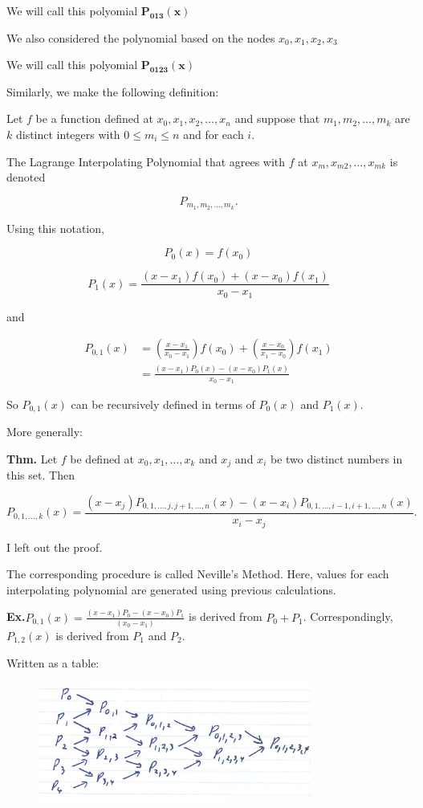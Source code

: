 \documentclass[12pt]{article}
\newcommand{\thm}{\textbf{Thm.}\xspace}
\newcommand{\Ex}{\textbf{Ex.}\xspace}
\begin{document}
We will call this polyomial $\mathbf{P_{013}(x)}$

\noindent
We also considered the polynomial based on the nodes $x_0, x_1, x_2, x_3$

We will call this polyomial $\mathbf{P_{0123}(x)}$

Similarly, we make the following definition:

Let $f$ be a function defined at $x_0, x_1, x_2, \dots, x_n$ and suppose that
$m_1, m_2, \dots ,m_k$ are $k$ distinct integers with $0\leq m_i \leq n$ and
for each $i$. 

The Lagrange Interpolating Polynomial that agrees with $f$ at 
$x_m, x_{m2}, \dots, x_{mk}$ is denoted

\[
  P_{m_1, m_2, \dots, m_k}
.\]

Using this notation,

\[
P_0(x) = f(x_0)
\]

\[
P_1(x) = \frac{(x - x_1) f(x_0) + (x - x_0) f(x_1)}{x_0 - x_1}
\]

and 


\begin{align*}
  P_{0,1}(x) &= \left( \frac{x - x_1}{x_0 - x_1} \right) f(x_0) + \left( \frac{x - x_0}{x_1 - x_0} \right) f(x_1) \\
             &= \frac{(x - x_1) P_0(x) - (x - x_0) P_1(x)}{x_0 - x_1}
\end{align*}

So $P_{0,1}(x)$ can be recursively defined in terms of $P_0(x)$ and $P_1(x)$.

More generally:

\thm Let $f$ be defined at $x_0, x_1, \dots, x_k$ and $x_j$ and $x_i$ be two
distinct numbers in this set. Then

\[
  P_{0,1,\dots,k}(x) = 
  \frac{(x - x_j) P_{0,1,\dots,j,j+1,\dots,n}(x) - (x - x_i) P_{0,1,\dots,i-1,i+1,\dots,n}(x)}{x_i - x_j}
.\]

\proof I left out the proof.

The corresponding procedure is called Neville's Method. Here, values for each 
interpolating polynomial are generated using previous calculations.

\Ex $\displaystyle P_{0,1}(x) = \frac{(x-x_1)P_0 - (x-x_0) P_1}{(x_0 - x_1)}$ is
derived from $P_0 + P_1$. Correspondingly, $P_{1,2}(x)$ is derived from $P_1$
and $P_2$.

Written as a table:

\begin{figure}[h]
    \centering
    \includegraphics[width=0.8\textwidth]{Lecture 021 Neville's Method Table.jpg}
\end{figure}
\end{document}
